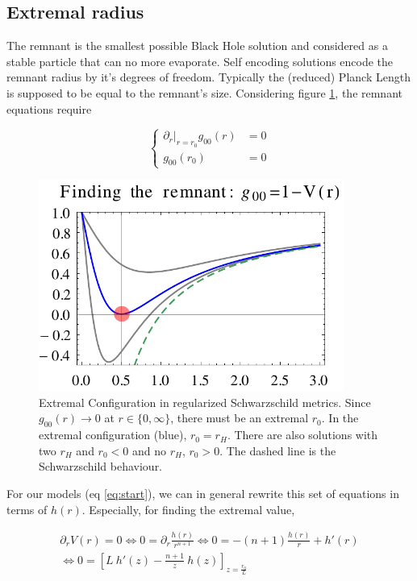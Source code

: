\documentclass[10pt,a4paper, fleqn]{article}
\begin{document}
\subsection{Extremal radius}
The remnant is the smallest possible Black Hole solution and considered as a stable particle that can no more evaporate. Self encoding solutions encode the remnant radius by it's degrees of freedom. Typically the (reduced) Planck Length is supposed to be equal to the remnant's size. Considering figure \ref{fig:extremal}, the remnant equations require

\begin{equation}
\begin{cases}
  \left. \partial_r \right|_{r=r_0} g_{00}(r) &= 0 \\
  g_{00}(r_0) &= 0
\end{cases}
\end{equation}

\begin{figure}[t]
\center%
\includegraphics[width=10cm]{mathematica/remnant-plot.pdf}
\caption{Extremal Configuration in regularized Schwarzschild metrics. Since $g_{00}(r) \to 0$ at $r\in\{0,\infty\}$, there must be an extremal $r_0$. In the extremal configuration (blue), $r_0 = r_H$. There are also solutions with two $r_H$ and $r_0<0$ and no $r_H$, $r_0>0$. The dashed line is the Schwarzschild behaviour.}\label{fig:extremal}
\end{figure}

For our models (eq \ref{eq:start}), we can in general rewrite this set of equations in terms of $h(r)$. Especially, for finding the extremal value,

\begin{multline}
\partial_r V(r) = 0
   \Leftrightarrow  0 = \partial_r \frac{h(r)}{r^{n+1}}
   \Leftrightarrow  0 = -(n+1) \frac{h(r)}{r} + h'(r) \\
   \Leftrightarrow  0 = \left[L~h'(z)  -\frac{n+1}z~h(z)  \right]_{z=\frac{r_0} L}
\end{multline}
\end{document}
